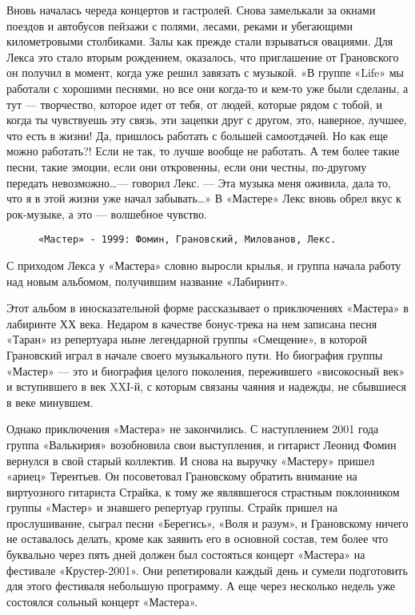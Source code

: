 Вновь началась череда концертов и гастролей. Снова замелькали за окнами поездов и автобусов пейзажи с полями, лесами,
реками и убегающими километровыми столбиками. Залы как прежде стали взрываться овациями. Для Лекса это стало вторым
рождением, оказалось, что приглашение от Грановского он получил в момент, когда уже решил завязать с музыкой. «В группе
«Life» мы работали с хорошими песнями, но все они когда-то и кем-то уже были сделаны, а тут — творчество, которое идет
от тебя, от людей, которые рядом с тобой, и когда ты чувствуешь эту связь, эти зацепки друг с другом, это, наверное,
лучшее, что есть в жизни! Да, пришлось работать с большей самоотдачей. Но как еще можно работать?! Если не так, то лучше
вообще не работать. А тем более такие песни, такие эмоции, если они откровенны, если они честны, по-другому передать
невозможно\ldots — говорил Лекс. — Эта музыка меня оживила, дала то, что я в этой жизни уже начал забывать\ldots» В
«Мастере» Лекс вновь обрел вкус к рок-музыке, а это — волшебное чувство.

\begin{figure}[h]
    \centering
    \caption{\texttt{«Мастер» - 1999: Фомин, Грановский, Милованов, Лекс.}}
\end{figure}

С приходом Лекса у «Мастера» словно выросли крылья, и группа начала работу над новым альбомом, получившим название
«Лабиринт».

Этот альбом в иносказательной форме рассказывает о приключениях «Мастера» в лабиринте ХХ века. Недаром в качестве
бонус-трека на нем записана песня «Таран» из репертуара ныне легендарной группы «Смещение», в которой Грановский играл в
начале своего музыкального пути. Но биография группы «Мастер» — это и биография целого поколения, пережившего
«високосный век» и вступившего в век XXI-й, с которым связаны чаяния и надежды, не сбывшиеся в веке минувшем.

Однако приключения «Мастера» не закончились. С наступлением 2001 года группа «Валькирия» возобновила свои выступления, и
гитарист Леонид Фомин вернулся в свой старый коллектив. И снова на выручку «Мастеру» пришел «ариец» Терентьев. Он
посоветовал Грановскому обратить внимание на виртуозного гитариста Страйка, к тому же являвшегося страстным поклонником
группы «Мастер» и знавшего репертуар группы. Страйк пришел на прослушивание, сыграл песни «Берегись», «Воля и разум», и
Грановскому ничего не оставалось делать, кроме как заявить его в основной состав, тем более что буквально через пять
дней должен был состояться концерт «Мастера» на фестивале «Крустер-2001». Они репетировали каждый день и сумели
подготовить для этого фестиваля небольшую программу. А еще через несколько недель уже состоялся сольный концерт
«Мастера».

